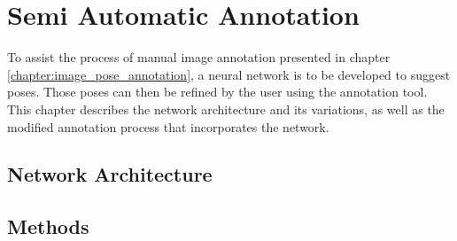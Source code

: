 \chapter{Semi Automatic Annotation} \label{chapter:semi_automatic}

To assist the process of manual image annotation presented in chapter \ref{chapter:image_pose_annotation}, a neural network is to be developed to suggest poses. Those poses can then be refined by the user using the annotation tool. This chapter describes the network architecture and its variations, as well as the modified annotation process that incorporates the network.

\section{Network Architecture}




\section{Methods}


